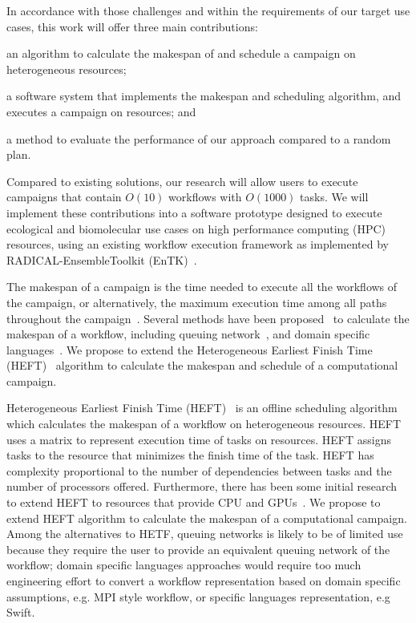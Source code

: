 In accordance with those challenges and within the requirements of our target use cases, this work will offer three main contributions: 
\begin{inparaenum}[(1)]
\item an algorithm to calculate the makespan of and schedule a campaign on heterogeneous resources;
\item a software system that implements the makespan and scheduling algorithm, and executes a campaign on resources; and 
\item a method to evaluate the performance of our approach compared to a random plan. 
\end{inparaenum}
Compared to existing solutions, our research will allow users to execute campaigns that contain $O(10)$ workflows with $O(1000)$ tasks. We will implement these contributions into a software prototype designed to execute ecological and biomolecular use cases on high performance computing (HPC) resources, using an existing workflow execution framework as implemented by RADICAL-EnsembleToolkit (EnTK)~\cite{balasubramanian2018harnessing}.

The makespan of a campaign is the time needed to execute all the workflows of the campaign, or alternatively, the maximum execution time among all paths throughout the campaign~\cite{chirkin2017execution}. Several methods have been proposed~\cite{lu2019review} to calculate the makespan of a workflow, including queuing network~\cite{yao2019throughput,bao2019performance}, and domain specific languages~\cite{carothers2017durango,maheshwari2016workflow}. We propose to extend the Heterogeneous Earliest Finish Time (HEFT)~\cite{topcuoglu2002performance} algorithm to calculate the makespan and schedule of a computational campaign. 


Heterogeneous Earliest Finish Time (HEFT)~\cite{topcuoglu2002performance} is an offline scheduling algorithm which calculates the makespan of a workflow on heterogeneous resources. HEFT uses a matrix to represent execution time of tasks on resources. HEFT assigns tasks to the resource that minimizes the finish time of the task. HEFT has complexity proportional to the number of dependencies between tasks and the number of processors offered. Furthermore, there has been some initial research to extend HEFT to resources that provide CPU and GPUs~\cite{shetti2013optimization}. We propose to extend HEFT algorithm to calculate the makespan of a computational campaign. Among the alternatives to HETF, queuing networks is likely to be of limited use because they require the user to provide an equivalent queuing network of the workflow; domain specific languages approaches would require too much engineering effort to convert a workflow representation based on domain specific assumptions, e.g. MPI style workflow, or specific languages representation, e.g Swift.

